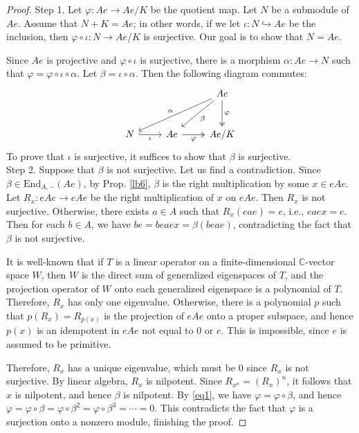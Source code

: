 \documentclass[11pt,b5paper,notitlepage]{article}
\theoremstyle{definition}
\theoremstyle{plain}
\newcommand{\End}{\mathrm{End}} %
\newcommand{\Cbb}{\mathbb C}
\numberwithin{equation}{section}
\begin{document}
\begin{proof}
Step 1. Let $\varphi:Ae\rightarrow Ae/K$ be the quotient map. Let $N$ be a submodule of $Ae$. Assume that $N+K=Ae$; in other words, if we let $\iota:N\hookrightarrow Ae$ be the inclusion, then $\varphi\circ\iota:N\rightarrow Ae/K$ is surjective. Our goal is to show that $N=Ae$.

Since $Ae$ is projective and $\varphi\circ\iota$ is surjective, there is a morphism $\alpha:Ae\rightarrow N$ such that $\varphi=\varphi\circ\iota\circ\alpha$. Let $\beta=\iota\circ\alpha$. Then the following diagram commutes:
\begin{equation}\label{eq1}
\begin{tikzcd}[row sep=large]
                  &             & Ae \arrow[lld,"\alpha"'] \arrow[ld,"\beta"] \arrow[d, two heads, "\varphi"] \\
N \arrow[r, hook,"\iota"'] & Ae \arrow[r,"\varphi"', two heads] & Ae/K                               
\end{tikzcd}
\end{equation}
To prove that $\iota$ is surjective, it suffices to show that $\beta$ is surjective.\\[-1ex]

Step 2. Suppose that $\beta$ is not surjective. Let us find a contradiction. Since $\beta\in\End_{A,-}(Ae)$, by Prop. \ref{lb6}, $\beta$ is the right multiplication by some $x\in eAe$. Let $R_x:eAe\rightarrow eAe$ be the right multiplication of $x$ on $eAe$. Then $R_x$ is not surjective. Otherwise, there exists $a\in A$ such that $R_x(eae)=e$, i.e., $eaex=e$. Then for each $b\in A$, we have $be=beaex=\beta(beae)$, contradicting the fact that $\beta$ is not surjective.

It is well-known that if $T$ is a linear operator on a finite-dimensional $\Cbb$-vector space $W$, then $W$ is the direct sum of generalized eigenspaces of $T$, and the projection operator of $W$ onto each generalized eigenspace is a polynomial of $T$. Therefore, $R_x$ has only one eigenvalue. Otherwise, there is a polynomial $p$ such that $p(R_x)=R_{p(x)}$ is the projection of $eAe$ onto a proper subspace, and hence $p(x)$ is an idempotent in $eAe$ not equal to $0$ or $e$. This is impossible, since $e$ is assumed to be primitive.

Therefore, $R_x$ has a unique eigenvalue, which must be $0$ since $R_x$ is not surjective. By linear algebra, $R_x$ is nilpotent. Since $R_{x^n}=(R_x)^n$, it follows that $x$ is nilpotent, and hence $\beta$ is nilpotent. By \eqref{eq1}, we have $\varphi=\varphi\circ\beta$, and hence $\varphi=\varphi\circ\beta=\varphi\circ\beta^2=\varphi\circ\beta^3=\cdots=0$. This contradicts the fact that $\varphi$ is a surjection onto a nonzero module, finishing the proof.
\end{proof}
\end{document}
